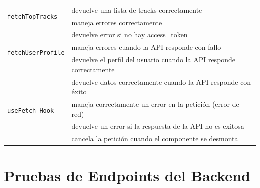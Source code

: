 \begin{longtable}{|p{5cm}|p{9cm}|}
    \multirow{2}{*}{\texttt{fetchTopTracks}}   & devuelve una lista de tracks correctamente                                    \\ \cline{2-2}
                                               & maneja errores correctamente                                                  \\ \hline


    \multirow{3}{*}{\texttt{fetchUserProfile}} & devuelve error si no hay access\_token                                        \\ \cline{2-2}
                                               & maneja errores cuando la API responde con fallo                               \\ \cline{2-2}
                                               & devuelve el perfil del usuario cuando la API responde correctamente           \\ \hline


    \multirow{4}{*}{\texttt{useFetch Hook}}    & devuelve datos correctamente cuando la API responde con éxito                 \\ \cline{2-2}
                                               & maneja correctamente un error en la petición (error de red)                   \\ \cline{2-2}
                                               & devuelve un error si la respuesta de la API no es exitosa                     \\ \cline{2-2}
                                               & cancela la petición cuando el componente se desmonta                          \\ \hline
\end{longtable}

\section{Pruebas de Endpoints del Backend}

